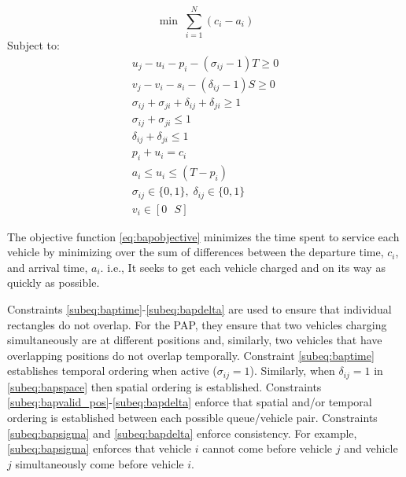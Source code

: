 \documentclass[utf8]{FrontiersinHarvard}
\begin{document}
\begin{equation}
	\label{eq:bapobjective}
	\min\; \sum_{i=1}^N (c_i - a_i)
\end{equation}
Subject to:
\begin{subequations}
\label{eq:bapconstrs}
\begin{align}
    u_j - u_i - p_i - (\sigma_{ij} - 1)T \geq 0                  \label{subeq:baptime}          \\
    v_j - v_i - s_i - (\delta_{ij} - 1)S \geq 0                \label{subeq:bapspace}         \\
    \sigma_{ij} + \sigma_{ji} + \delta_{ij} + \delta_{ji} \geq 1 \label{subeq:bapvalid_pos}     \\
    \sigma_{ij} + \sigma_{ji} \leq 1                              \label{subeq:bapsigma}        \\
    \delta_{ij} + \delta_{ji} \leq 1                              \label{subeq:bapdelta}        \\
    p_i + u_i = c_i                                               \label{subeq:bapdetach}       \\
    a_i \leq u_i \leq (T - p_i)                                   \label{subeq:bapvalid_starts} \\
    \sigma_{ij} \in \{0,1\},\;\delta_{ij} \in \{0,1\}\;           \label{subeq:bapsdspace}      \\
    v_i \in [0 \mbox{ } S ]                                       \label{subeq:bapvspace}
\end{align}
\end{subequations}

\noindent

The objective function \eqref{eq:bapobjective} minimizes the time spent to service each vehicle by minimizing over the
sum of differences between the departure time, $c_i$, and arrival time, $a_i$. i.e., It seeks to get each vehicle
charged and on its way as quickly as possible.

Constraints \ref{subeq:baptime}-\ref{subeq:bapdelta} are used to ensure that individual rectangles do not overlap. For
the PAP, they ensure that two vehicles charging simultaneously are at different positions and, similarly, two vehicles
that have overlapping positions do not overlap temporally. Constraint \eqref{subeq:baptime} establishes temporal
ordering when active ($\sigma_{ij}=1$). Similarly, when $\delta_{ij} =1$ in \eqref{subeq:bapspace} then spatial ordering is
established. Constraints \ref{subeq:bapvalid_pos}-\ref{subeq:bapdelta} enforce that spatial and/or temporal ordering is
established between each possible queue/vehicle pair. Constraints \eqref{subeq:bapsigma} and \eqref{subeq:bapdelta}
enforce consistency. For example, \eqref{subeq:bapsigma} enforces that vehicle $i$ cannot come before vehicle $j$ and
vehicle $j$ simultaneously come before vehicle $i$.
\end{document}
